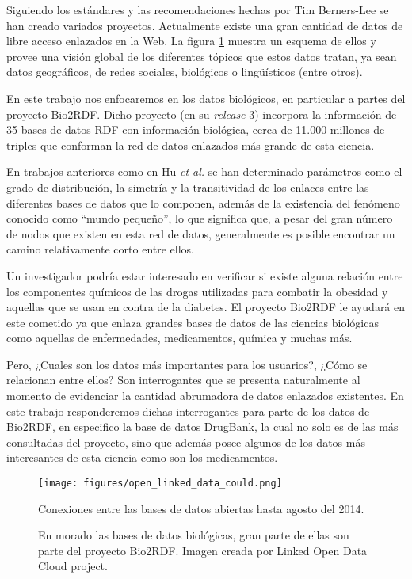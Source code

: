 Siguiendo los estándares y las recomendaciones hechas por Tim Berners-Lee se han
creado variados proyectos.
Actualmente existe una gran cantidad de datos de libre acceso enlazados en la
Web. La figura \ref{fig:cloud} muestra un esquema de ellos y provee una visión
global de los diferentes tópicos que estos datos tratan, ya sean datos
geográficos, de redes sociales, biológicos o lingüísticos (entre otros).

En este trabajo nos enfocaremos en los datos biológicos, en particular a partes
del proyecto Bio2RDF.
Dicho proyecto (en su \emph{release} 3) incorpora la información de 35 bases de
datos RDF con información biológica, cerca de 11.000 millones de triples que
conforman la red de datos enlazados más grande de esta ciencia.

En trabajos anteriores como en Hu \emph{et al.}\cite{hu2015link} se han
determinado parámetros como el grado de distribución, la simetría y la
transitividad de los enlaces entre las diferentes bases de datos que lo
componen, además de la existencia del fenómeno conocido como ``mundo pequeño'',
lo que significa que, a pesar del gran número de nodos que existen en esta red
de datos, generalmente es posible encontrar un camino relativamente corto entre
ellos.

Un investigador podría estar interesado en verificar si existe alguna relación
entre los componentes químicos de las drogas utilizadas para combatir la
obesidad y aquellas que se usan en contra de la diabetes.
El proyecto Bio2RDF le ayudará en este cometido ya que enlaza grandes bases de
datos de las ciencias biológicas como aquellas de enfermedades, medicamentos,
química y muchas más.

Pero, ¿Cuales son los datos más importantes para los usuarios?, ¿Cómo se
relacionan entre ellos? Son interrogantes que se presenta naturalmente al
momento de evidenciar la cantidad abrumadora de datos enlazados existentes.
En este trabajo responderemos dichas interrogantes para parte de los datos de
Bio2RDF, en especifico la base de datos DrugBank, la cual no solo es de las más
consultadas del proyecto, sino que además posee algunos de los datos más
interesantes de esta ciencia como son los medicamentos.

\begin{figure}[ht]
  \centering
  \texttt{[image: figures/open\_linked\_data\_could.png]}
  \caption{Conexiones entre las bases de datos abiertas hasta agosto del 2014.}
  \vspace{-.2cm}
  \caption*{
    En morado las bases de datos biológicas, gran parte de ellas son parte del
    proyecto Bio2RDF.
    Imagen creada por Linked Open Data Cloud project\cite{lod:cloud}.}
  \label{fig:cloud}
\end{figure}
~\vspace{-1cm}

